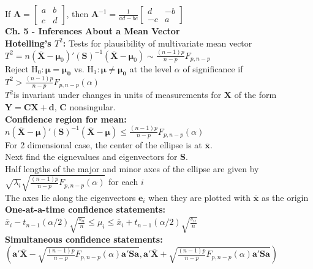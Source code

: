 \documentclass[5pt,twocolumn]{article}
\begin{document}
	If $\mathbf{A} = \begin{bmatrix}
a & b\\
c & d
\end{bmatrix}$, then $\mathbf{A}^{-1} = \frac{1}{ad - bc}\begin{bmatrix}
d & -b\\
-c & a
\end{bmatrix}$\\
	\noindent \textbf{Ch. 5 - Inferences About a Mean Vector}\\
	\textbf{Hotelling's $T^2$:} Tests for plausibility of multivariate mean vector\\
	\indent $T^2 = n(\mathbf{\overline{X}} - \mathbf{\mu}_0)'\left(\mathbf{S}\right)^{-1}(\mathbf{\overline{X}} - \mathbf{\mu}_0) \sim \frac{(n-1)p}{n-p}F_{p, n-p}$\\
	\indent Reject $\text{H}_0: \mathbf{\mu} = \mathbf{\mu_0}$ vs. $\text{H}_1: \mathbf{\mu} \neq \mathbf{\mu_0}$ at the level $\alpha$ of significance if $T^2 > \frac{(n-1)p}{n-p}F_{p, n-p}(\alpha)$\\
	\indent $T^2$is invariant under changes in units of measurements for $\mathbf{X}$ of the form $\mathbf{Y} = \mathbf{C}\mathbf{X} + \mathbf{d}$, $\mathbf{C}$ nonsingular.\\
	\textbf{Confidence region for mean:} $n(\mathbf{\overline{X}} - \mathbf{\mu})'\left(\mathbf{S}\right)^{-1}(\mathbf{\overline{X}} - \mathbf{\mu}) \leq \frac{(n-1)p}{n-p}F_{p, n-p}(\alpha)$\\
	\indent For 2 dimensional case, the center of the ellipse is at $\mathbf{\overline{x}}$. \\
	\indent Next find the eignevalues and eigenvectors for $\mathbf{S}$.\\
	\indent Half lengths of the major and minor axes of the ellipse are given by $\sqrt{\lambda_i}\sqrt{\frac{(n-1)p}{n-p}F_{p, n-p}(\alpha)}$ for each $i$\\
	\indent The axes lie along the eigenvectors $\mathbf{e}_i$ when they are plotted with $\mathbf{\overline{x}}$ as the origin\\
	\textbf{One-at-a-time confidence statements:}\\
	\indent $\overline{x}_i - t_{n-1}(\alpha/2)\sqrt{\frac{s_{ii}}{n}} \leq \mu_i \leq \overline{x}_i + t_{n-1}(\alpha/2)\sqrt{\frac{s_{ii}}{n}}$\\
	\textbf{Simultaneous confidence statements:}\\
	\indent $\left(\mathbf{a}'\mathbf{\overline{X}} - \sqrt{\frac{(n-1)p}{n-p}F_{p, n-p}(\alpha)\mathbf{a'Sa}}, \mathbf{a}'\mathbf{\overline{X}} + \sqrt{\frac{(n-1)p}{n-p}F_{p, n-p}(\alpha)\mathbf{a'Sa}}\right)$ \\
\end{document}
